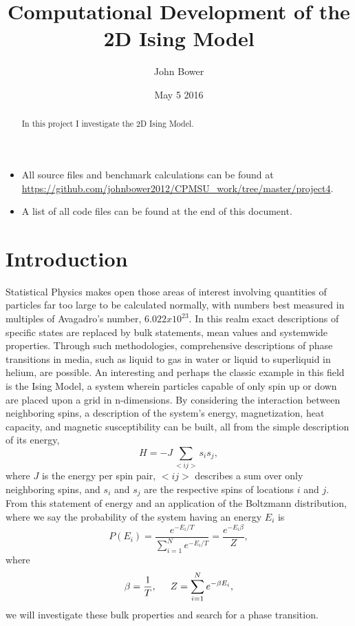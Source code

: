 \documentclass[11pt,a4paper]{article}
\title{Computational Development of the 2D Ising Model}
\author{John Bower}
\date{May 5 2016}
\begin{document}
\maketitle

\begin{abstract}

In this project I investigate the 2D Ising Model.

\end{abstract}

\begin{itemize}
\item All source files and benchmark calculations can be found at \url{https://github.com/johnbower2012/CPMSU_work/tree/master/project4}.
\item A list of all code files can be found at the end of this document.
\end{itemize}

\section{Introduction}


Statistical Physics makes open those areas of interest involving quantities of particles far too large to be calculated normally, with numbers best measured in multiples of Avagadro's number, $6.022 x 10^23$. In this realm exact descriptions of specific states are replaced by bulk statements, mean values and systemwide properties. Through such methodologies, comprehensive descriptions of phase transitions in media, such as liquid to gas in water or liquid to superliquid in helium, are possible. An interesting and perhaps the classic example in this field is the Ising Model, a system wherein particles capable of only spin up or down are placed upon a grid in n-dimensions. By considering the interaction between neighboring spins, a description of the system's energy, magnetization, heat capacity, and magnetic susceptibility can be built, all from the simple description of its energy,
\begin{equation}
H = -J\sum\limits_{<ij>}s_is_j,
\end{equation}
where $J$ is the energy per spin pair, $<ij>$ describes a sum over only neighboring spins, and $s_i$ and $s_j$ are the respective spins of locations $i$ and $j$. From this statement of energy and 
an application of the Boltzmann distribution, where we say the probability of the system having an energy $E_i$ is
\begin{equation}
P(E_i) = \frac{e^{-E_i/T}}{\sum\limits^N_{i=1} e^{-E_i/T}} = \frac{e^{-E_i\beta}}{Z},
\end{equation}
where
\begin{equation}
\beta = \frac{1}{T}, \hspace{0.5 cm} Z = \sum\limits^N_{i=1} e^{-\beta E_i},
\end{equation}
we will investigate these bulk properties and search for a phase transition.
\end{document}
